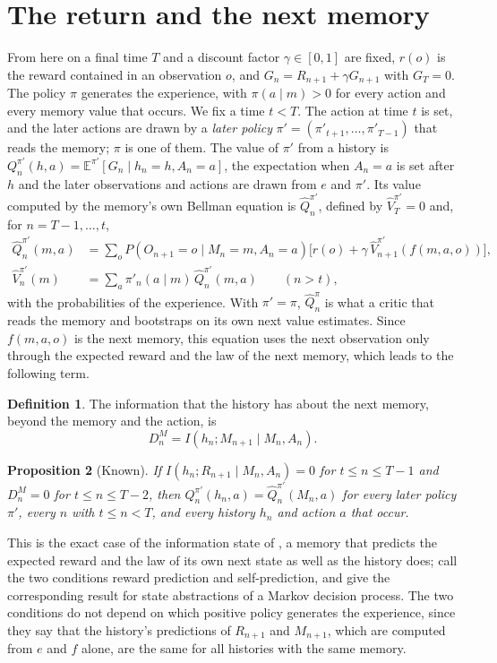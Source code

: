 \documentclass{article}
\newtheorem{proposition}{Proposition}[section]
\theoremstyle{definition}
\newtheorem{definition}[proposition]{Definition}
\theoremstyle{remark}
\newcommand{\E}{\mathbb{E}}
\begin{document}
\section{The return and the next memory}\label{sec:bellman}

From here on a final time $T$ and a discount factor $\gamma\in[0,1]$ are fixed, $r(o)$ is the reward contained in an observation $o$, and $G_n=R_{n+1}+\gamma G_{n+1}$ with $G_T=0$. The policy $\pi$ generates the experience, with $\pi(a\mid m)>0$ for every action and every memory value that occurs. We fix a time $t<T$. The action at time $t$ is set, and the later actions are drawn by a \emph{later policy} $\pi'=(\pi'_{t+1},\dots,\pi'_{T-1})$ that reads the memory; $\pi$ is one of them. The value of $\pi'$ from a history is $Q^{\pi'}_n(h,a)=\E^{\pi'}[G_n\mid h_n=h,A_n=a]$, the expectation when $A_n=a$ is set after $h$ and the later observations and actions are drawn from $e$ and $\pi'$. Its value computed by the memory's own Bellman equation is $\hat Q^{\pi'}_n$, defined by $\hat V^{\pi'}_T=0$ and, for $n=T-1,\dots,t$,
\begin{align*}
\hat Q^{\pi'}_n(m,a)&=\sum_oP(O_{n+1}=o\mid M_n=m,A_n=a)\big[r(o)+\gamma\,\hat V^{\pi'}_{n+1}(f(m,a,o))\big],\\
\hat V^{\pi'}_n(m)&=\sum_a\pi'_n(a\mid m)\,\hat Q^{\pi'}_n(m,a)\qquad(n>t),
\end{align*}
with the probabilities of the experience. With $\pi'=\pi$, $\hat Q^\pi_n$ is what a critic that reads the memory and bootstraps on its own next value estimates. Since $f(m,a,o)$ is the next memory, this equation uses the next observation only through the expected reward and the law of the next memory, which leads to the following term.

\begin{definition}\label{def:DM}
The information that the history has about the next memory, beyond the memory and the action, is
\[
D^M_n=I(h_n;M_{n+1}\mid M_n,A_n).
\]
\end{definition}

\begin{proposition}[Known]\label{prop:every}
If $I(h_n;R_{n+1}\mid M_n,A_n)=0$ for $t\le n\le T-1$ and $D^M_n=0$ for $t\le n\le T-2$, then $Q^{\pi'}_n(h_n,a)=\hat Q^{\pi'}_n(M_n,a)$ for every later policy $\pi'$, every $n$ with $t\le n<T$, and every history $h_n$ and action $a$ that occur.
\end{proposition}

This is the exact case of the information state of \citet{subramanian2022approximate}, a memory that predicts the expected reward and the law of its own next state as well as the history does; \citet{ni2024bridging} call the two conditions reward prediction and self-prediction, and \citet{li2006towards} give the corresponding result for state abstractions of a Markov decision process. The two conditions do not depend on which positive policy generates the experience, since they say that the history's predictions of $R_{n+1}$ and $M_{n+1}$, which are computed from $e$ and $f$ alone, are the same for all histories with the same memory.
\end{document}
